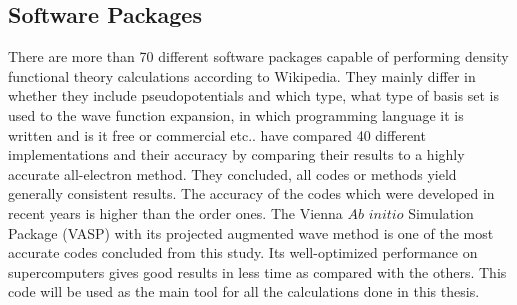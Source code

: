 \subsection{Software Packages}
There are more than 70 different software packages capable of performing density functional theory calculations according to Wikipedia\cite{dft_sws}. They mainly differ in whether they include pseudopotentials and which type, what type of basis set is used to the wave function expansion, in which programming language it is written and is it free or commercial etc.. \citet{Lejaeghereaad3000} have compared 40 different implementations and their accuracy by comparing their results to a highly accurate all-electron method. They concluded, all codes or methods yield generally consistent results. The accuracy of the codes which were developed in recent years is higher than the order ones. The Vienna $Ab$ $initio$ Simulation Package (VASP) \cite{VASP1,VASP2} with its projected augmented wave method is one of the most accurate codes concluded from this study. Its well-optimized performance on supercomputers gives good results in less time as compared with the others. This code will be used as the main tool for all the calculations done in this thesis.